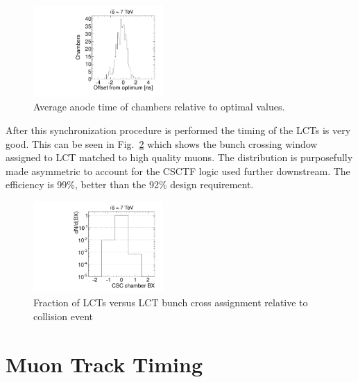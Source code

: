 \begin{figure}
  \begin{center}
      \includegraphics[clip=true, trim=0.0cm 0cm 3.0cm 0cm, width=0.44\textwidth]{figures/timing/average_anodes}
      \caption[Average anode time of chambers relative to optimal values.]
      {Average anode time of chambers relative to optimal values.
        }
      \label{fig:average_anodes}
  \end{center}
\end{figure}

After this synchronization procedure is performed the timing of the LCTs is very good. This can be seen in Fig.~\ref{fig:ALCTBX} which shows the bunch crossing window
assigned to LCT matched to high quality muons. The distribution is purposefully made asymmetric to account for the CSCTF logic used further downstream.
The efficiency is 99\%, better than the 92\% design requirement.

\begin{figure}
  \begin{center}
      \includegraphics[clip=true, width=0.44\textwidth]{figures/timing/ALCT_Bx}
      \caption[Fraction of LCTs versus LCT bunch crossing window assignment relative to collision event]
      {Fraction of LCTs versus LCT bunch cross assignment relative to collision event
        }
      \label{fig:ALCTBX}
  \end{center}
\end{figure}

\section{Muon Track Timing}

